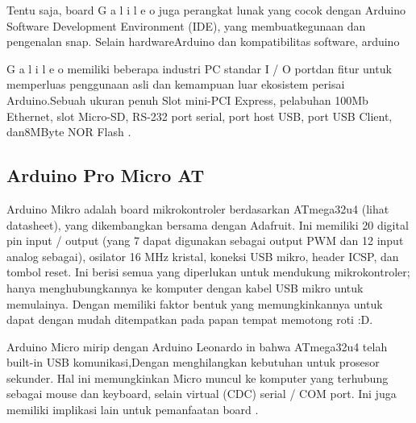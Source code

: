 Tentu saja, board  G a l i l e o juga perangkat lunak yang cocok dengan Arduino Software Development Environment (IDE), yang membuatkegunaan dan pengenalan snap. Selain hardwareArduino dan kompatibilitas software, arduino

G a l i l e o memiliki beberapa industri PC standar I / O portdan fitur untuk memperluas penggunaan asli dan kemampuan luar ekosistem perisai Arduino.Sebuah ukuran penuh Slot mini-PCI Express, pelabuhan 100Mb Ethernet, slot Micro-SD, RS-232 port serial, port host USB, port USB Client, dan8MByte NOR Flash .

\subsection{Arduino Pro Micro AT} 
Arduino Mikro adalah board mikrokontroler berdasarkan ATmega32u4 (lihat datasheet), yang dikembangkan bersama dengan Adafruit. Ini memiliki 20 digital pin input / output (yang 7 dapat digunakan sebagai output PWM dan 12 input analog sebagai), osilator 16 MHz kristal, koneksi USB mikro, header ICSP, dan tombol reset. Ini berisi semua yang diperlukan untuk mendukung mikrokontroler; hanya menghubungkannya ke komputer dengan kabel USB mikro untuk memulainya. Dengan  memiliki faktor bentuk yang memungkinkannya untuk dapat dengan mudah ditempatkan pada papan tempat memotong roti :D. 

Arduino Micro mirip dengan Arduino Leonardo in bahwa ATmega32u4 telah built-in USB komunikasi,Dengan menghilangkan kebutuhan untuk prosesor sekunder. Hal ini memungkinkan Micro muncul ke komputer yang terhubung sebagai mouse dan keyboard, selain virtual (CDC) serial / COM port. Ini juga memiliki implikasi lain untuk pemanfaatan board .
